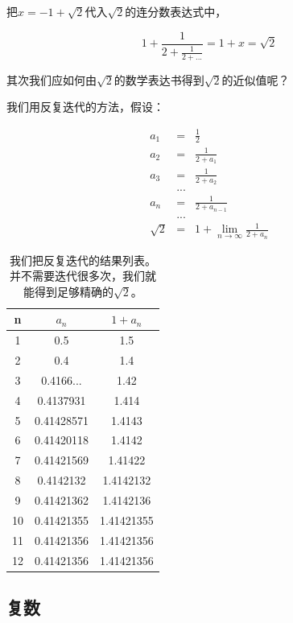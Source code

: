 把$x= -1 + \sqrt{2}$代入$\sqrt{2}$的连分数表达式中，

\begin{equation*}
1 + \frac{1}{2+ \frac{1}{2+...}} = 1 + x = \sqrt{2}
\end{equation*}

其次我们应如何由$\sqrt{2}$的数学表达书得到$\sqrt{2}$的近似值呢？

我们用反复迭代的方法，假设：

\begin{eqnarray*}
a_1 &=& \frac{1}{2} \\
a_2 &=& \frac{1}{2 + a_1} \\
a_3 & = & \frac{1}{2 + a_2} \\
{} & {...} & {} \\
a_n & = & \frac{1}{2+a_{n-1}}\\
{}  & {...} &  {} \\
\sqrt{2} & = & 1 + \lim\limits_{n \to \infty} \frac{1}{2+a_n}
\end{eqnarray*}

\begin{table}[htdp]
\caption{我们把反复迭代的结果列表。并不需要迭代很多次，我们就能得到足够精确的$\sqrt{2}$。}
\begin{center}
\begin{tabular}{|c|c|c|}
\hline
n & $a_n$ & $1 + a_n$  \\
\hline
1 & 0.5 & 1.5 \\
2 & 0.4 & 1.4 \\
3 & 0.4166... & 1.42 \\
4 & 0.4137931 & 1.414 \\
5 & 0.41428571 & 1.4143 \\
6 & 0.41420118 & 1.4142 \\
7 & 0.41421569 & 1.41422 \\
8 & 0.4142132 & 1.4142132 \\
9 & 0.41421362 & 1.4142136 \\
10 & 0.41421355 & 1.41421355 \\
11 & 0.41421356 & 1.41421356 \\
12 & 0.41421356 & 1.41421356 \\
\hline
\end{tabular}
\end{center}
\label{default}
\end{table}%

\subsection{复数}

